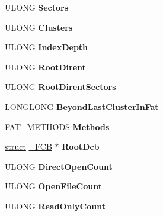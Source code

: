 \begin{DoxyCompactItemize}
\mbox{\label{struct___v_c_b_a0103972f50fbc1308652dc225a110d99}} 
U\+L\+O\+NG {\bfseries Sectors}
\item 
\mbox{\label{struct___v_c_b_add8f08e9357408dbc8ea0b9ddda06b0b}} 
U\+L\+O\+NG {\bfseries Clusters}
\item 
\mbox{\label{struct___v_c_b_af3e440e7c03e410fb51776ad7f65f15f}} 
U\+L\+O\+NG {\bfseries Index\+Depth}
\item 
\mbox{\label{struct___v_c_b_a8d358dcd80300532af923340f88682c9}} 
U\+L\+O\+NG {\bfseries Root\+Dirent}
\item 
\mbox{\label{struct___v_c_b_af72b334e21bec575fc5716b716885cd0}} 
U\+L\+O\+NG {\bfseries Root\+Dirent\+Sectors}
\item 
\mbox{\label{struct___v_c_b_a0d797b4b7178e988b3f9b9593dcf172c}} 
L\+O\+N\+G\+L\+O\+NG {\bfseries Beyond\+Last\+Cluster\+In\+Fat}
\item 
\mbox{\label{struct___v_c_b_a2edd7a7d63039295114923b265a50d08}} 
\hyperlink{struct___f_a_t___m_e_t_h_o_d_s}{F\+A\+T\+\_\+\+M\+E\+T\+H\+O\+DS} {\bfseries Methods}
\item 
\mbox{\label{struct___v_c_b_a06a3bda83bfcf09df661882c76d2d8eb}} 
\hyperlink{interfacestruct}{struct} \hyperlink{struct___f_c_b}{\+\_\+\+F\+CB} $\ast$ {\bfseries Root\+Dcb}
\item 
\mbox{\label{struct___v_c_b_aded88528f90b49081d80a6f649388944}} 
U\+L\+O\+NG {\bfseries Direct\+Open\+Count}
\item 
\mbox{\label{struct___v_c_b_a05d36fdb17184d5f66a3893cf6c4eae0}} 
U\+L\+O\+NG {\bfseries Open\+File\+Count}
\item 
\mbox{\label{struct___v_c_b_ab7bc2bd9393aa3b3af0eacc5f54fab15}} 
U\+L\+O\+NG {\bfseries Read\+Only\+Count}
\item 
\mbox{\label{struct___v_c_b_a99813564ea3bd91d22a9a04b538b00bf}} 

\end{DoxyCompactItemize}
